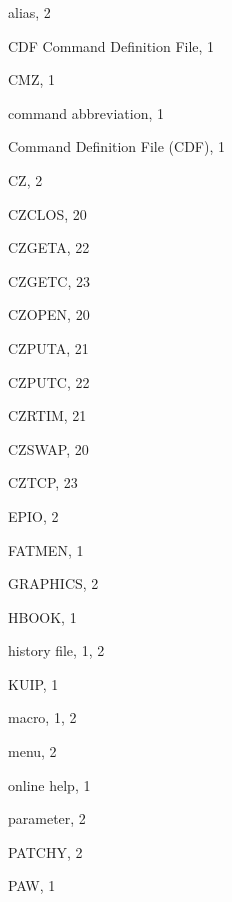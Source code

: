 \begin{theindex}

  \item alias, 2

  \indexspace

  \item CDF Command Definition File, 1
  \item CMZ, 1
  \item command abbreviation, 1
  \item Command Definition File (CDF), 1
  \item CZ, 2
  \item CZCLOS, 20
  \item CZGETA, 22
  \item CZGETC, 23
  \item CZOPEN, 20
  \item CZPUTA, 21
  \item CZPUTC, 22
  \item CZRTIM, 21
  \item CZSWAP, 20
  \item CZTCP, 23

  \indexspace

  \item EPIO, 2

  \indexspace

  \item FATMEN, 1

  \indexspace

  \item GRAPHICS, 2

  \indexspace

  \item HBOOK, 1
  \item history file, 1, 2

  \indexspace

  \item KUIP, 1

  \indexspace

  \item macro, 1, 2
  \item menu, 2

  \indexspace

  \item online help, 1

  \indexspace

  \item parameter, 2
  \item PATCHY, 2
  \item PAW, 1


\end{theindex}
